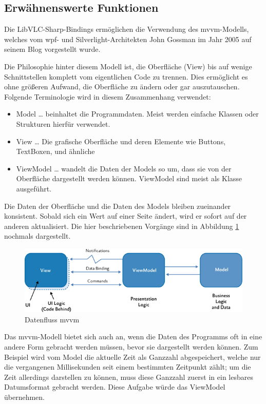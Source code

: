 \subsection{Erwähnenswerte Funktionen}
Die LibVLC-Sharp-Bindings ermöglichen die Verwendung des \ac{mvvm}-Modells, welches vom \ac{wpf}- und Silver\-light-Architekten John Gossman im Jahr 2005 auf seinem Blog vorgestellt wurde. \cite[vlg.][The Evolution of Model-View-ViewModel]{msdoc-mvvm}\par

Die Philosophie hinter diesem Modell ist, die Oberfläche (View) bis auf wenige Schnittstellen komplett vom eigentlichen Code zu trennen.
Dies ermöglicht es ohne größeren Aufwand, die Oberfläche zu ändern oder gar auszutauschen.
Folgende Terminologie wird in diesem Zusammenhang verwendet:
\begin{itemize}
\item Model … beinhaltet die Programmdaten. Meist werden einfache Klassen oder Strukturen hierfür verwendet.
\item View … Die grafische Oberfläche und deren Elemente wie Buttons, TextBoxen, und ähnliche
\item ViewModel … wandelt die Daten der Models so um, dass sie von der Oberfläche dargestellt werden können. ViewModel sind meist als Klasse ausgeführt.
\end{itemize}

Die Daten der Oberfläche und die Daten des Models bleiben zueinander konsistent.
Sobald sich ein Wert auf einer Seite ändert, wird er sofort auf der anderen aktualisiert.
Die hier beschriebenen Vorgänge sind in Abbildung \ref{fig:mvvm-flow} nochmals dargestellt.
\begin{figure}
    \centering
    \includegraphics[width=.9\linewidth]{images/software_module/MVVM.png}
    \caption{Datenfluss \ac{mvvm} \cite{ms-mvvm-flow}}
    \label{fig:mvvm-flow}
\end{figure}

Das \ac{mvvm}-Modell bietet sich auch an, wenn die Daten des Programms oft in eine andere Form gebracht werden müssen, bevor sie dargestellt werden können. Zum Beispiel wird vom Model die aktuelle Zeit als Ganzzahl abgespeichert, welche nur die vergangenen Millisekunden seit einem bestimmten Zeitpunkt zählt; um die Zeit allerdings darstellen zu können, muss diese Ganzzahl zuerst in ein lesbares Datumsformat gebracht werden. Diese Aufgabe würde das ViewModel übernehmen.

